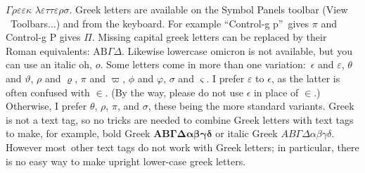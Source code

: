 $\mathit{\Gamma }\rho \varepsilon \varepsilon \kappa $ $\lambda \varepsilon
\tau \tau \varepsilon \rho \sigma $. Greek letters are available on the
Symbol Panels toolbar (View \TEXTsymbol{>}\TEXTsymbol{>}\ Toolbars...) and
from the keyboard. For example \textquotedblleft Control-g
p\textquotedblright\ gives $\pi $ and Control-g P gives $\Pi $. Missing
capital greek letters can be replaced by their Roman equivalents: $\mathrm{AB%
}\Gamma \Delta $. Likewise lowercase omicron is not available, but you can
use an italic oh, $o$. Some letters come in more than one variation:\ $%
\epsilon $ and $\varepsilon $, $\theta $ and $\vartheta $, $\rho $ and $%
\varrho $, $\pi $ and $\varpi $, $\phi $ and $\varphi $, $\sigma $ and $%
\varsigma $. I prefer $\varepsilon $ to $\epsilon $, as the latter is often
confused with $\in .$ (By the way, please do not use $\epsilon $ in place of 
$\in $.) Otherwise, I prefer $\theta $, $\rho $, $\pi $, and $\sigma $,
these being the more standard variants. Greek is not a text tag, so no
tricks are needed to combine Greek letters with text tags to make, for
example, bold Greek $\mathbf{AB\Gamma \Delta \alpha \beta \gamma \delta }$
or italic Greek $\mathit{AB\Gamma \Delta \alpha \beta \gamma \delta }$.
However most\ other text tags do not work with Greek letters; in particular,
there is no easy way to make upright lower-case greek letters.
